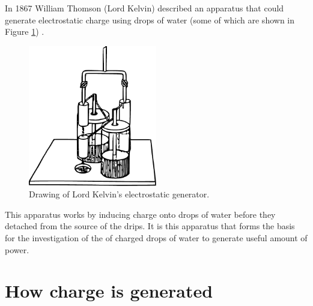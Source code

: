 
In 1867 William Thomson (Lord Kelvin) described an apparatus that
could generate electrostatic charge using drops of water (some of
which are shown in Figure \ref{Figure_Drawing_KelvinWaterDripper_OriginalDevice})
\cite{Thomson1867}.
\begin{figure}[H]
\begin{centering}
\includegraphics[width=0.5\textwidth]{content/appendices/chargedWaterDrops/graphics/Figure_Drawing_KelvinWaterDripper_OriginalDevice}
\par\end{centering}

\protect\caption{Drawing of Lord Kelvin's electrostatic generator.}


\label{Figure_Drawing_KelvinWaterDripper_OriginalDevice}

\end{figure}
 This apparatus works by inducing charge onto drops of water before
they detached from the source of the drips. It is this apparatus that
forms the basis for the investigation of the of charged drops of water
to generate useful amount of power.


\section{How charge is generated}

